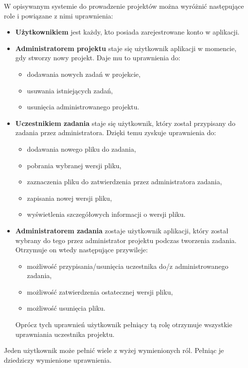 W opisywanym systemie do prowadzenie projektów można wyróżnić następujące role i powiązane z nimi uprawnienia:
\begin{itemize}
    \item \textbf{Użytkownikiem} jest każdy, kto posiada zarejestrowane konto w aplikacji.
    \item \textbf{Administratorem projektu} staje się użytkownik aplikacji w momencie, gdy stworzy nowy projekt.
    Daje mu to uprawnienia do:
    \begin{itemize}
        \item dodawania nowych zadań w projekcie,
        \item usuwania istniejących zadań,
        \item usunięcia administrowanego projektu.
    \end{itemize}
    \item \textbf{Uczestnikiem zadania} staje się użytkownik, który został przypisany do zadania przez administratora.
    Dzięki temu zyskuje uprawnienia do:
    \begin{itemize}
        \item dodawania nowego pliku do zadania,
        \item pobrania wybranej wersji pliku,
        \item zaznaczenia pliku do zatwierdzenia przez administratora zadania,
        \item zapisania nowej wersji pliku,
        \item wyświetlenia szczegółowych informacji o wersji pliku.
    \end{itemize}
    \item \textbf{Administratorem zadania} zostaje użytkownik aplikacji, który został wybrany do tego przez administrator projektu podczas tworzenia zadania.
    Otrzymuje on wtedy następujące przywileje:
    \begin{itemize}
        \item możliwość przypisania/usunięcia uczestnika do/z administrowanego zadania,
        \item możliwość zatwierdzenia ostatecznej wersji pliku,
        \item możliwość usunięcia pliku.
    \end{itemize}
    Oprócz tych uprawnień użytkownik pełniący tą rolę otrzymuje wszystkie uprawniania uczestnika projektu.
\end{itemize}

Jeden użytkownik może pełnić wiele z wyżej wymienionych ról.
Pełniąc je dziedziczy wymienione uprawnienia. 


